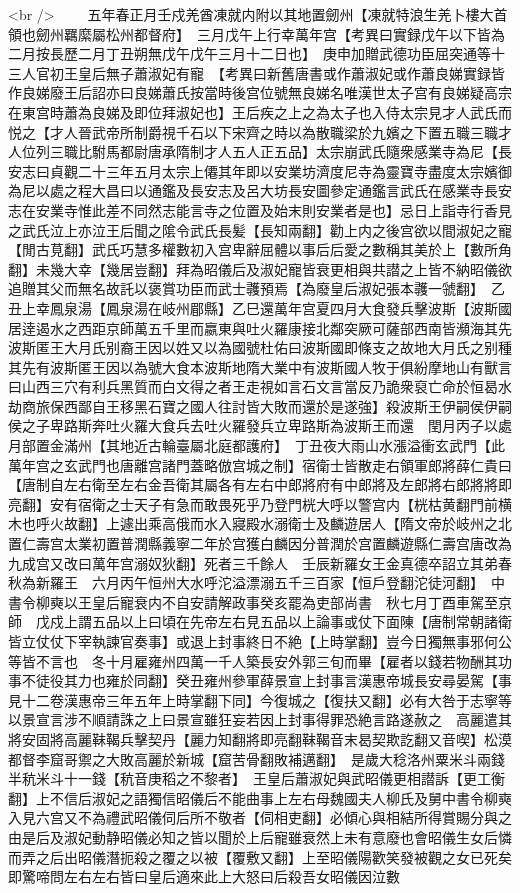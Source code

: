 <br />
　　五年春正月壬戍羌酋凍就内附以其地置劒州【凍就特浪生羌卜樓大首領也劒州羈縻屬松州都督府】　三月戊午上行幸萬年宫【考異曰實録戊午以下皆為二月按長歷二月丁丑朔無戊午戊午三月十二日也】　庚申加贈武德功臣屈突通等十三人官初王皇后無子蕭淑妃有寵　【考異曰新舊唐書或作蕭淑妃或作蕭良娣實録皆作良娣廢王后詔亦曰良娣蕭氏按當時後宫位號無良娣名唯漢世太子宫有良娣疑高宗在東宫時蕭為良娣及即位拜淑妃也】王后疾之上之為太子也入侍太宗見才人武氏而悦之【才人晉武帝所制爵視千石以下宋齊之時以為散職梁於九嬪之下置五職三職才人位列三職比駙馬都尉唐承隋制才人五人正五品】太宗崩武氏隨衆感業寺為尼【長安志曰貞觀二十三年五月太宗上僊其年即以安業坊濟度尼寺為靈寶寺盡度太宗嬪御為尼以處之程大昌曰以通鑑及長安志及呂大坊長安圖參定通鑑言武氏在感業寺長安志在安業寺惟此差不同然志能言寺之位置及始末則安業者是也】忌日上詣寺行香見之武氏泣上亦泣王后聞之隂令武氏長髪【長知兩翻】勸上内之後宫欲以間淑妃之寵【閒古莧翻】武氏巧慧多權數初入宫卑辭屈體以事后后愛之數稱其美於上【數所角翻】未幾大幸【幾居豈翻】拜為昭儀后及淑妃寵皆衰更相與共譛之上皆不納昭儀欲追贈其父而無名故託以褒賞功臣而武士彠預焉【為廢皇后淑妃張本彠一虢翻】　乙丑上幸鳳泉湯【鳳泉湯在岐州郿縣】乙巳還萬年宫夏四月大食發兵擊波斯【波斯國居逹遏水之西距京師萬五千里而嬴東與吐火羅康接北鄰突厥可薩部西南皆瀕海其先波斯匿王大月氏别裔王因以姓又以為國號杜佑曰波斯國即條支之故地大月氏之别種其先有波斯匿王因以為號大食本波斯地隋大業中有波斯國人牧于俱紛摩地山有獸言曰山西三穴有利兵黑質而白文得之者王走視如言石文言當反乃詭衆裒亡命於恒曷水劫商旅保西鄙自王移黑石寶之國人往討皆大敗而還於是遂強】殺波斯王伊嗣侯伊嗣侯之子卑路斯奔吐火羅大食兵去吐火羅發兵立卑路斯為波斯王而還　閏月丙子以處月部置金滿州【其地近古輪臺屬北庭都護府】　丁丑夜大雨山水漲溢衝玄武門【此萬年宫之玄武門也唐離宫諸門蓋略倣宫城之制】宿衛士皆散走右領軍郎將薛仁貴曰【唐制自左右衛至左右金吾衛其屬各有左右中郎將府有中郎將及左郎將右郎將將即亮翻】安有宿衛之士天子有急而敢畏死乎乃登門桄大呼以警宫内【桄枯黄翻門前横木也呼火故翻】上遽出乘高俄而水入寢殿水溺衛士及麟遊居人【隋文帝於岐州之北置仁壽宫太業初置普潤縣義寧二年於宫獲白麟因分普潤於宫置麟遊縣仁壽宫唐改為九成宫又改曰萬年宫溺奴狄翻】死者三千餘人　壬辰新羅女王金真德卒詔立其弟春秋為新羅王　六月丙午恒州大水呼沱溢漂溺五千三百家【恒戶登翻沱徒河翻】　中書令柳奭以王皇后寵衰内不自安請解政事癸亥罷為吏部尚書　秋七月丁酉車駕至京師　戊戍上謂五品以上曰頃在先帝左右見五品以上論事或仗下面陳【唐制常朝諸衛皆立仗仗下宰執諫官奏事】或退上封事終日不絶【上時掌翻】豈今日獨無事邪何公等皆不言也　冬十月雇雍州四萬一千人築長安外郭三旬而畢【雇者以錢若物酬其功事不徒役其力也雍於同翻】癸丑雍州參軍薛景宣上封事言漢惠帝城長安尋晏駕【事見十二卷漢惠帝三年五年上時掌翻下同】今復城之【復扶又翻】必有大咎于志寧等以景宣言涉不順請誅之上曰景宣雖狂妄若因上封事得罪恐絶言路遂赦之　高麗遣其將安固將高麗靺鞨兵擊契丹【麗力知翻將即亮翻靺鞨音末曷契欺訖翻又音喫】松漠都督李窟哥禦之大敗高麗於新城【窟苦骨翻敗補邁翻】　是歲大稔洛州粟米斗兩錢半秔米斗十一錢【秔音庚稻之不黎者】　王皇后蕭淑妃與武昭儀更相譛訴【更工衡翻】上不信后淑妃之語獨信昭儀后不能曲事上左右母魏國夫人柳氏及舅中書令柳奭入見六宫又不為禮武昭儀伺后所不敬者【伺相吏翻】必傾心與相結所得賞賜分與之由是后及淑妃動静昭儀必知之皆以聞於上后寵雖衰然上未有意廢也會昭儀生女后憐而弄之后出昭儀潛扼殺之覆之以被【覆敷又翻】上至昭儀陽歡笑發被觀之女已死矣即驚啼問左右左右皆曰皇后適來此上大怒曰后殺吾女昭儀因泣數